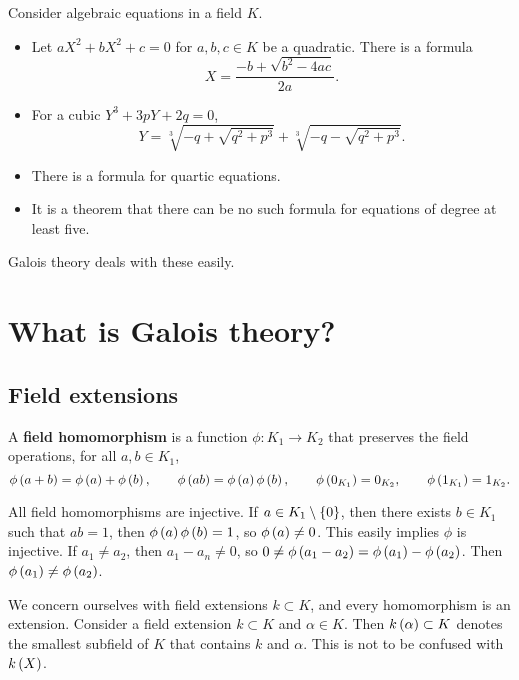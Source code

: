 \begin{example*}
Consider algebraic equations in a field $ K $.
\begin{itemize}
\item Let $ aX^2 + bX^2 + c = 0 $ for $ a, b, c \in K $ be a quadratic. There is a formula
$$ X = \dfrac{-b + \sqrt{b^2 - 4ac}}{2a}. $$
\item For a cubic $ Y^3 + 3pY + 2q = 0 $,
$$ Y = \sqrt[3]{-q + \sqrt{q^2 + p^3}} + \sqrt[3]{-q - \sqrt{q^2 + p^3}}. $$
\item There is a formula for quartic equations.
\item It is a theorem that there can be no such formula for equations of degree at least five.
\end{itemize}
Galois theory deals with these easily.
\end{example*}

\pagebreak

\section{What is Galois theory?}

\subsection{Field extensions}


\begin{definition}
A \textbf{field homomorphism} is a function $ \phi : K_1 \to K_2 $ that preserves the field operations, for all $ a, b \in K_1 $,
$$ \phi\br{a + b} = \phi\br{a} + \phi\br{b}, \qquad \phi\br{ab} = \phi\br{a}\phi\br{b}, \qquad \phi\br{0_{K_1}} = 0_{K_2}, \qquad \phi\br{1_{K_1}} = 1_{K_2}. $$
\end{definition}

\begin{remark*}
All field homomorphisms are injective. If $ a \in K_1 \setminus \cbr{0} $, then there exists $ b \in K_1 $ such that $ ab = 1 $, then $ \phi\br{a}\phi\br{b} = 1 $, so $ \phi\br{a} \ne 0 $. This easily implies $ \phi $ is injective. If $ a_1 \ne a_2 $, then $ a_1 - a_n \ne 0 $, so $ 0 \ne \phi\br{a_1 - a_2} = \phi\br{a_1} - \phi\br{a_2} $. Then $ \phi\br{a_1} \ne \phi\br{a_2} $.
\end{remark*}

We concern ourselves with field extensions $ k \subset K $, and every homomorphism is an extension. Consider a field extension $ k \subset K $ and $ \alpha \in K $. Then $ k\br{\alpha} \subset K $ denotes the smallest subfield of $ K $ that contains $ k $ and $ \alpha $. This is not to be confused with $ k\br{X} $.

